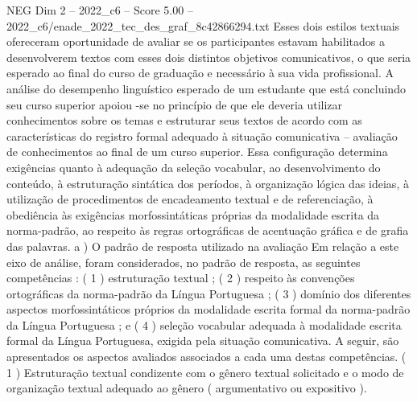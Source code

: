 \begin{textsample}{NEG Dim 2 – 2022\_c6 – Score 5.00 – 2022\_c6/enade\_2022\_tec\_des\_graf\_8c42866294.txt}
Esses dois estilos textuais ofereceram oportunidade de avaliar se os participantes estavam habilitados a desenvolverem textos com esses dois distintos objetivos comunicativos, o que seria esperado ao final do curso de graduação e necessário à sua vida profissional.
A análise do desempenho linguístico esperado de um estudante que está concluindo seu curso superior apoiou -se no princípio de que ele deveria utilizar conhecimentos sobre os temas e estruturar seus textos de acordo com as características do registro formal adequado à situação comunicativa – avaliação de conhecimentos ao final de um curso superior.
Essa configuração determina exigências quanto à adequação da seleção vocabular, ao desenvolvimento do conteúdo, à estruturação sintática dos períodos, à organização lógica das ideias, à utilização de procedimentos de encadeamento textual e de referenciação, à obediência às exigências morfossintáticas próprias da modalidade escrita da norma-padrão, ao respeito às regras ortográficas de acentuação gráfica e de grafia das palavras. a ) O padrão de resposta utilizado na avaliação Em relação a este eixo de análise, foram considerados, no padrão de resposta, as seguintes competências : ( 1 ) estruturação textual ; ( 2 ) respeito às convenções ortográficas da norma-padrão da Língua Portuguesa ; ( 3 ) domínio dos diferentes aspectos morfossintáticos próprios da modalidade escrita formal da norma-padrão da Língua Portuguesa ; e ( 4 ) seleção vocabular adequada à modalidade escrita formal da Língua Portuguesa, exigida pela situação comunicativa.
A seguir, são apresentados os aspectos avaliados associados a cada uma destas competências. ( 1 ) Estruturação textual condizente com o gênero textual solicitado e o modo de organização textual adequado ao gênero ( argumentativo ou expositivo ).

\end{textsample}
